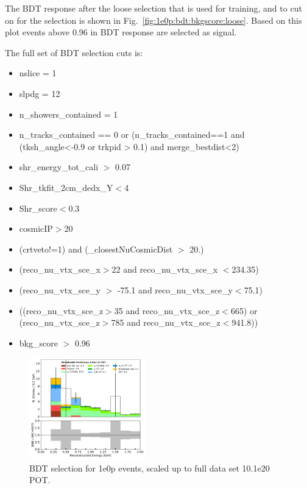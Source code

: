 \documentclass[a4paper]{article}
\begin{document}
The BDT response after the loose selection that is used for training, and to cut on for the selection is shown in Fig.~\ref{fig:1e0p:bdt:bkgscore:loose}.  Based on this plot events above 0.96 in BDT response are selected as signal.

The full set of BDT selection cuts is:
\begin{itemize}
    \item nslice = 1
    \item slpdg = 12
    \item n\_showers\_contained = 1
    \item n\_tracks\_contained == 0 or (n\_tracks\_contained==1 and (tksh\_angle<-0.9 or trkpid > 0.1) and merge\_bestdist<2)
    \item shr\_energy\_tot\_cali $>$ 0.07
    \item Shr\_tkfit\_2cm\_dedx\_Y$<$4
    \item Shr\_score$<$0.3
    \item cosmicIP$>$20
    \item (crtveto!=1) and (\_closestNuCosmicDist $>$ 20.)
    \item (reco\_nu\_vtx\_sce\_x$>$22 and reco\_nu\_vtx\_sce\_x $<$234.35)
    \item (reco\_nu\_vtx\_sce\_y $>$ -75.1 and reco\_nu\_vtx\_sce\_y$<$75.1)
    \item ((reco\_nu\_vtx\_sce\_z$>$35 and reco\_nu\_vtx\_sce\_z$<$665) or (reco\_nu\_vtx\_sce\_z$>$785 and reco\_nu\_vtx\_sce\_z$<$941.8))
    \item bkg\_score $>$ 0.96
\end{itemize}

\begin{figure}[H]
\begin{center}
\includegraphics[width=0.45\textwidth]{1e0p/reco_e_01162020_RUN3_bgbdt.pdf}
\caption{\label{fig:1e0p:bdt:RUN3} BDT selection for 1e0p events, scaled up to full data set 10.1e20 POT.}
\end{center}
\end{figure}
\end{document}
